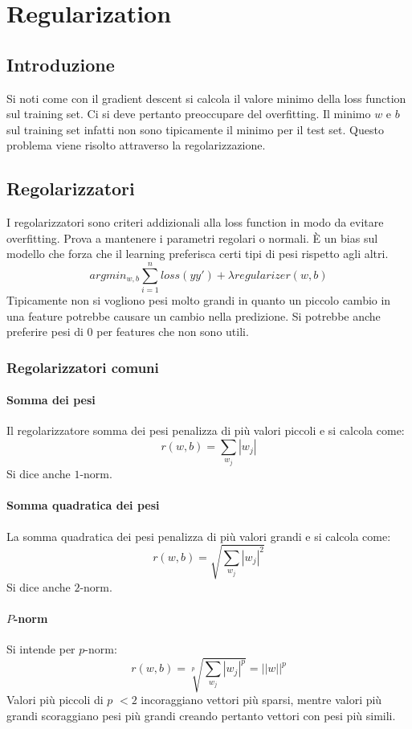 \chapter{Regularization}

\section{Introduzione}
Si noti come con il gradient descent si calcola il valore minimo della loss function sul training set.
Ci si deve pertanto preoccupare del overfitting.
Il minimo $w$ e $b$ sul training set infatti non sono tipicamente il minimo per il test set.
Questo problema viene risolto attraverso la regolarizzazione.

\section{Regolarizzatori}
I regolarizzatori sono criteri addizionali alla loss function in modo da evitare overfitting.
Prova a mantenere i parametri regolari o normali.
\`E un bias sul modello che forza che il learning preferisca certi tipi di pesi rispetto agli altri.
$$argmin_{w,b}\sum\limits_{i=1}^nloss(yy')+\lambda regularizer(w,b)$$
Tipicamente non si vogliono pesi molto grandi in quanto un piccolo cambio in una feature potrebbe causare un cambio nella predizione.
Si potrebbe anche preferire pesi di $0$ per features che non sono utili.

	\subsection{Regolarizzatori comuni}

		\subsubsection{Somma dei pesi}
		Il regolarizzatore somma dei pesi penalizza di pi\`u valori piccoli e si calcola come:
		$$r(w,b)=\sum\limits_{w_j}|w_j|$$
		Si dice anche $1$-norm.

		\subsubsection{Somma quadratica dei pesi}
		La somma quadratica dei pesi penalizza di pi\`u valori grandi e si calcola come:
		$$r(w,b)=\sqrt{\sum\limits_{w_j}|w_j|^2}$$
		Si dice anche $2$-norm.

		\subsubsection{$P$-norm}
		Si intende per $p$-norm:
		$$r(w,b)=\sqrt[p]{\sum\limits_{w_j}|w_j|^p}=||w||^p$$
		Valori pi\`u piccoli di $p$ $<2$ incoraggiano vettori pi\`u sparsi, mentre valori pi\`u grandi scoraggiano pesi pi\`u grandi creando pertanto vettori con pesi pi\`u simili.

